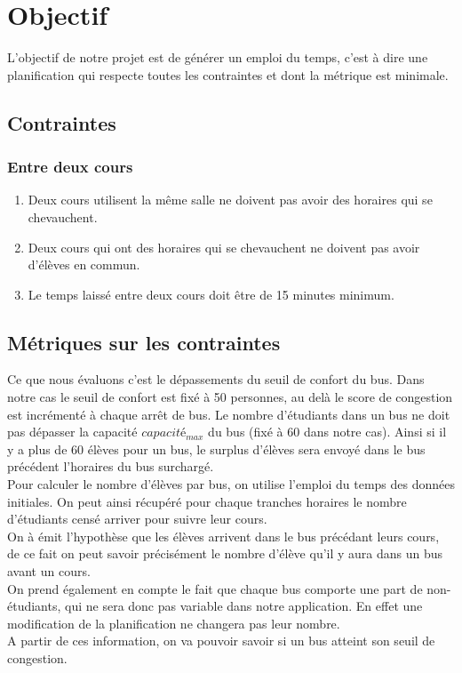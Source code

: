 \documentclass[a4paper,11pt]{article}
\begin{document}
\section{Objectif}
	L'objectif de notre projet est de générer un emploi du temps, c'est à dire une planification qui respecte toutes les contraintes et dont la métrique est minimale.
	\subsection{Contraintes}
		\subsubsection{Entre deux cours}
				\begin{enumerate}
					\item Deux cours utilisent la même salle ne doivent pas avoir des horaires qui se chevauchent.
					\item Deux cours qui ont des horaires qui se chevauchent ne doivent pas avoir d'élèves en commun.
					\item Le temps laissé entre deux cours doit être de 15 minutes minimum.
				\end{enumerate}
	
	\subsection{Métriques sur les contraintes}
		Ce que nous évaluons c'est le dépassements du seuil de confort du bus. Dans notre cas le seuil de confort est fixé à 50 personnes, au delà le score de congestion est incrémenté à chaque arrêt de bus.
		Le nombre d'étudiants dans un bus ne doit pas dépasser la capacité $capacité_{max}$ du bus (fixé à 60 dans notre cas). Ainsi si il y a plus de 60 élèves pour un bus, le surplus d'élèves sera envoyé dans le bus précédent l'horaires du bus surchargé.\\
		Pour calculer le nombre d'élèves par bus, on utilise l'emploi du temps des données initiales. On peut ainsi récupéré pour chaque tranches horaires le nombre d'étudiants censé arriver pour suivre leur cours.\\
		On à émit l'hypothèse que les élèves arrivent dans le bus précédant leurs cours, de ce fait on peut savoir précisément le nombre d'élève qu'il y aura dans un bus avant un cours.\\
		On prend également en compte le fait que chaque bus comporte une part de non-étudiants, qui ne sera donc pas variable dans notre application. En effet une modification de la planification ne changera pas leur nombre.\\
		A partir de ces information, on va pouvoir savoir si un bus atteint son seuil de congestion.
		
\end{document}

